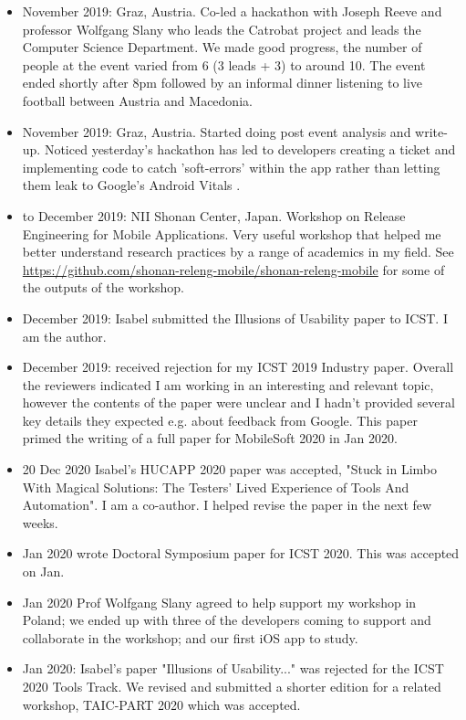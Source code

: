 \begin{itemize}
    \item {} November 2019: Graz, Austria. Co-led a hackathon with Joseph Reeve and professor Wolfgang Slany who leads the Catrobat project and leads the Computer Science Department. We made good progress, the number of people at the event varied from 6 (3 leads + 3) to around 10. The event ended shortly after 8pm followed by an informal dinner listening to live football between Austria and Macedonia.
    \item {} November 2019: Graz, Austria. Started doing post event analysis and write-up. Noticed yesterday's hackathon has led to developers creating a ticket and implementing code to catch 'soft-errors' within the app rather than letting them leak to Google's Android Vitals \citet{catroid_426_soft_crashes_should_not_be_reported_to_the_play_console}.
    \item {} to  December 2019: NII Shonan Center, Japan. Workshop on Release Engineering for Mobile Applications. Very useful workshop that helped me better understand research practices by a range of academics in my field. See \url{https://github.com/shonan-releng-mobile/shonan-releng-mobile} for some of the outputs of the workshop.
    \item {} December 2019: Isabel submitted the Illusions of Usability paper to ICST. I am the  author.
    \item {} December 2019: received rejection for my ICST 2019 Industry paper. Overall the reviewers indicated I am working in an interesting and relevant topic, however the contents of the paper were unclear and I hadn't provided several key details they expected e.g. about feedback from Google. This paper primed the writing of a full paper for MobileSoft 2020 in Jan 2020.
    \item 20 Dec 2020 Isabel's HUCAPP 2020 paper was accepted, "Stuck in Limbo With Magical Solutions: The Testers' Lived Experience of Tools And Automation". I am a co-author. I helped revise the paper in the next few weeks.
    \item Jan 2020 wrote Doctoral Symposium paper for ICST 2020. This was accepted on  Jan.
    \item Jan 2020 Prof Wolfgang Slany agreed to help support my workshop in Poland; we ended up with three of the developers coming to support and collaborate in the workshop; and our first iOS app to study.
    \item {} Jan 2020: Isabel's paper "Illusions of Usability..." was rejected for the ICST 2020 Tools Track. We revised and submitted a shorter edition for a related workshop, TAIC-PART 2020 which was accepted.

\end{itemize}
